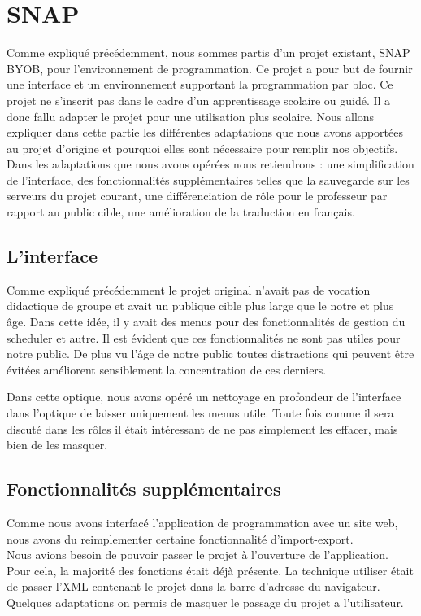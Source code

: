 \section{SNAP}
Comme expliqué précédemment, nous sommes partis d'un projet existant, SNAP BYOB, pour l'environnement de programmation. Ce projet a pour but de fournir une interface et un environnement supportant la programmation par bloc. Ce projet ne s'inscrit pas dans le cadre d'un apprentissage scolaire ou guidé. Il a donc fallu adapter le projet pour une utilisation plus scolaire. Nous allons expliquer dans cette partie les différentes adaptations que nous avons apportées au projet d'origine et pourquoi elles sont nécessaire pour remplir nos objectifs.\\

Dans les adaptations que nous avons opérées nous retiendrons : une simplification de l'interface, des fonctionnalités supplémentaires telles que la sauvegarde sur les serveurs du projet courant, une différenciation de rôle pour le professeur par rapport au public cible, une amélioration de la traduction en français.

\subsection{L'interface}
Comme expliqué précédemment le projet original n'avait pas de vocation didactique de groupe et avait un publique cible plus large que le notre et plus âge. Dans cette idée, il y avait des menus pour des fonctionnalités de gestion du scheduler et autre. Il est évident que ces fonctionnalités ne sont pas utiles pour notre public. De plus vu l'âge de notre public toutes distractions qui peuvent être évitées améliorent sensiblement la concentration de ces derniers.

Dans cette optique, nous avons opéré un nettoyage en profondeur de l'interface dans l'optique de laisser uniquement les menus utile. Toute fois comme il sera discuté dans les rôles il était intéressant de ne pas simplement les effacer, mais bien de les masquer.

\subsection{Fonctionnalités supplémentaires}
Comme nous avons interfacé l'application de programmation avec un site web, nous avons du reimplementer certaine fonctionnalité d'import-export.\\

Nous avions besoin de pouvoir passer le projet à l'ouverture de l'application. Pour cela, la majorité des fonctions était déjà présente. La technique utiliser était de passer l'XML contenant le projet dans la barre d'adresse du navigateur. Quelques adaptations on permis de masquer le passage du projet a l'utilisateur.\\

